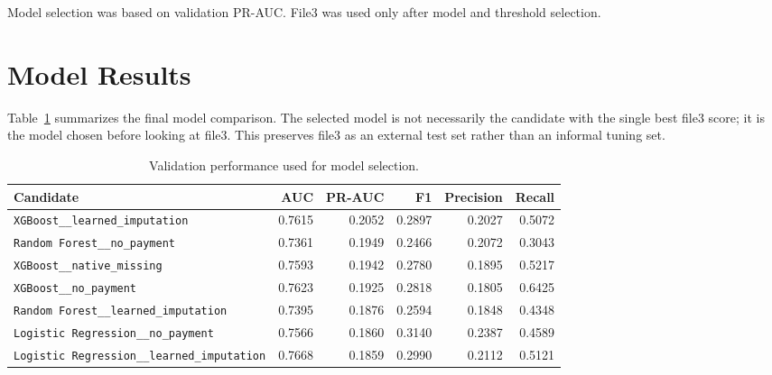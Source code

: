 \documentclass[11pt]{article}
\newcommand{\feature}[1]{\texttt{#1}}
\begin{document}
Model selection was based on validation PR-AUC. File3 was used only after model and threshold selection.

\section{Model Results}

Table~\ref{tab:model-results} summarizes the final model comparison. The selected model is not necessarily the candidate with the single best file3 score; it is the model chosen before looking at file3. This preserves file3 as an external test set rather than an informal tuning set.


\begin{table}[H]
\centering
\caption{Validation performance used for model selection.}
\label{tab:model-results}
\small
\begin{tabular}{p{5.0cm}rrrrr}
\toprule
Candidate & AUC & PR-AUC & F1 & Precision & Recall \\
\midrule
\feature{XGBoost\_\_learned\_imputation} & 0.7615 & 0.2052 & 0.2897 & 0.2027 & 0.5072 \\
\feature{Random Forest\_\_no\_payment} & 0.7361 & 0.1949 & 0.2466 & 0.2072 & 0.3043 \\
\feature{XGBoost\_\_native\_missing} & 0.7593 & 0.1942 & 0.2780 & 0.1895 & 0.5217 \\
\feature{XGBoost\_\_no\_payment} & 0.7623 & 0.1925 & 0.2818 & 0.1805 & 0.6425 \\
\feature{Random Forest\_\_learned\_imputation} & 0.7395 & 0.1876 & 0.2594 & 0.1848 & 0.4348 \\
\feature{Logistic Regression\_\_no\_payment} & 0.7566 & 0.1860 & 0.3140 & 0.2387 & 0.4589 \\
\feature{Logistic Regression\_\_learned\_imputation} & 0.7668 & 0.1859 & 0.2990 & 0.2112 & 0.5121 \\
\bottomrule
\end{tabular}
\end{table}
\end{document}
